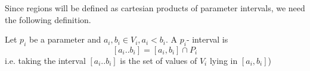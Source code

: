 Since regions will be defined as cartesian products of parameter intervals, we need the following definition.
\begin{definition} Let $p_{i}$ be a parameter and $a_{i},b_{i}\in V_{i},a_{i}<b_{i}$.
A $p_{i}$- interval is
	\[
	\left[a_{i}..b_{i}\right]=\left[a_{i},b_{i}\right]\cap P_{i}
	\]
i.e. taking the interval $\left[a_{i}..b_{i}\right]$
is the set of values of $V_{i}$ lying in $\left[a_{i},b_{i}\right]$)
\end{definition}


	\begin{figure}[t]
		\begin{center}
		\end{center}
	\end{figure}



